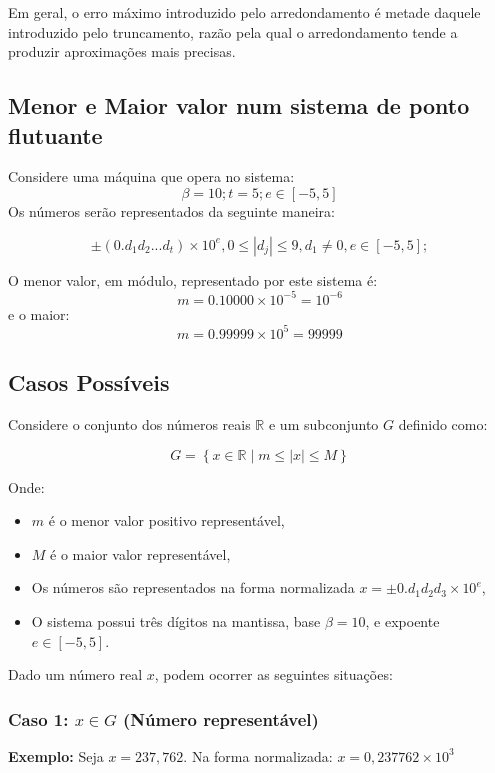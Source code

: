 Em geral, o erro máximo introduzido pelo arredondamento é metade daquele introduzido pelo truncamento, razão pela qual o arredondamento tende a produzir aproximações mais precisas.


\subsection*{Menor e Maior valor num sistema de ponto flutuante}


Considere uma máquina que opera no sistema:
\[
\beta = 10; t = 5; e \in [-5,5]
\]
Os números serão representados da seguinte maneira:

\[
\pm (0.d_{1}d_{2} . . . d_{t}) \times 10^e,  0 \leq |d_{j}| \leq 9,  d_{1} \neq 0, e \in [-5,5] ;
\]

O menor valor, em módulo, representado por este sistema é:
\[
m = 0.10000 \times 10^{-5} = 10^{-6}
\]
e o maior:
\[
m = 0.99999 \times 10^{5} = 99999
\]

\subsection{Casos Possíveis}

Considere o conjunto dos números reais \( \mathbb{R} \) e um subconjunto \( G \) definido como:

\[
G = \left\{ x \in \mathbb{R} \mid m \leq |x| \leq M \right\}
\]

Onde:
\begin{itemize}
  \item \( m \) é o menor valor positivo representável,
  \item \( M \) é o maior valor representável,
  \item Os números são representados na forma normalizada \( x = \pm 0.d_1d_2d_3 \times 10^e \),
  \item O sistema possui três dígitos na mantissa, base \( \beta = 10 \), e expoente \( e \in [-5, 5] \).
\end{itemize}

Dado um número real \( x \), podem ocorrer as seguintes situações:

\subsubsection{Caso 1: \( x \in G \) (Número representável)}

\textbf{Exemplo:} Seja \( x = 237{,}762 \).  
Na forma normalizada:
\(
x = 0{,}237762 \times 10^3
\)


